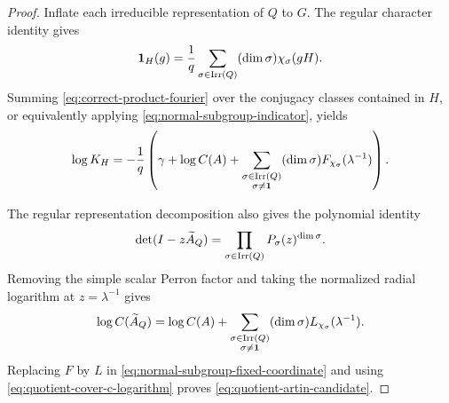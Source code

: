 \begin{proof}
Inflate each irreducible representation of \(Q\) to \(G\).  The regular
character identity gives
\begin{equation}\label{eq:normal-subgroup-indicator}
 \mathbf1_H(g)=\frac{1}{q}\sum_{\sigma\in\operatorname{Irr}(Q)}
       (\dim\sigma)\chi_\sigma(gH).
\end{equation}
Summing \eqref{eq:correct-product-fourier} over the conjugacy classes
contained in \(H\), or equivalently applying
\eqref{eq:normal-subgroup-indicator}, yields
\begin{equation}\label{eq:normal-subgroup-fixed-coordinate}
 \log K_H=-\frac{1}{q}\left(
   \gamma+\log C(A)+
   \sum_{\substack{\sigma\in\operatorname{Irr}(Q)\\\sigma\ne\mathbf1}}
      (\dim\sigma)F_{\chi_\sigma}(\lambda^{-1})\right).
\end{equation}

The regular representation decomposition also gives the polynomial identity
\begin{equation}\label{eq:quotient-regular-determinant-factorization}
 \det(I-z\widetilde A_Q)
 =\prod_{\sigma\in\operatorname{Irr}(Q)}P_\sigma(z)^{\dim\sigma}.
\end{equation}
Removing the simple scalar Perron factor and taking the normalized radial
logarithm at \(z=\lambda^{-1}\) gives
\begin{equation}\label{eq:quotient-cover-c-logarithm}
 \log C(\widetilde A_Q)=\log C(A)+
 \sum_{\substack{\sigma\in\operatorname{Irr}(Q)\\\sigma\ne\mathbf1}}
   (\dim\sigma)L_{\chi_\sigma}(\lambda^{-1}).
\end{equation}
Replacing \(F\) by \(L\) in
\eqref{eq:normal-subgroup-fixed-coordinate} and using
\eqref{eq:quotient-cover-c-logarithm} proves
\eqref{eq:quotient-artin-candidate}.


\end{proof}
